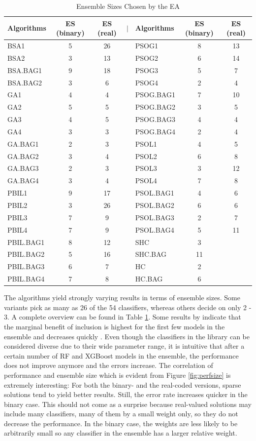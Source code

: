 \begin{table}[ht]
	\centering
	\begin{tabular}{lccllcc}
		\hline
		Algorithms & ES (binary) & ES (real) & $\mid$ & Algorithms & ES (binary) & ES (real) \\ 
		\hline
		BSA1 & 5 & 26 && PSOG1 & 8 & 13 \\ 
		BSA2 & 3 & 13 & &PSOG2 & 6 & 14 \\ 
		BSA.BAG1 & 9 & 18 && PSOG3 & 5 & 7 \\ 
		BSA.BAG2 & 3 & 6 & &PSOG4 & 2 & 4 \\ 
		GA1 & 4 & 4 & &PSOG.BAG1 & 7 & 10 \\ 
		GA2 & 5 & 5 & &PSOG.BAG2 & 3 & 5 \\ 
		GA3 & 4 & 5 & &PSOG.BAG3 & 4 & 4 \\ 
		GA4 & 3 & 3 & &PSOG.BAG4 & 2 & 4 \\ 
		GA.BAG1 & 2 & 3 && PSOL1 & 4 & 5 \\ 
		GA.BAG2 & 3 & 4 && PSOL2 & 6 & 8 \\ 
		GA.BAG3 & 2 & 3 & &PSOL3 & 3 & 12 \\ 
		GA.BAG4 & 3 & 4 & &PSOL4 & 7 & 8 \\ 
		PBIL1 & 9 & 17 & &PSOL.BAG1 & 4 & 6 \\ 
		PBIL2 & 3 & 26 & &PSOL.BAG2 & 6 & 6 \\ 
		PBIL3 & 7 & 9 & &PSOL.BAG3& 2 & 7 \\ 
		PBIL4 & 7 & 9 && PSOL.BAG4 & 5 & 11 \\ 
		PBIL.BAG1 & 8 & 12 && SHC & 3 & \\ 
		PBIL.BAG2 & 5 & 16 && SHC.BAG & 11 & \\ 
		PBIL.BAG3 & 6 & 7 && HC & 2 & \\ 
		PBIL.BAG4 & 7 & 8 && HC.BAG & 6 & \\ 
		\hline
	\end{tabular}
	\caption{Ensemble Sizes Chosen by the EA}
	\label{tbl:es}
\end{table}

The algorithms yield strongly varying results in terms of ensemble sizes. Some variants pick as many as 26 of the 54 classifiers, whereas others decide on only 2 - 3. A complete overview can be found in Table \ref{tbl:es}. Some results by \cite{opitz1999popular} indicate that the marginal benefit of inclusion is highest for the first few models in the ensemble and decreases quickly \cite[p. 190]{opitz1999popular}. Even though the classifiers in the library can be considered diverse due to their wide parameter range, it is intuitive that after a certain number of RF and XGBoost models in the ensemble, the performance does not improve anymore and the errors increase. The correlation of performance and ensemble size which is evident from Figure \ref{fig:perfsize} is extremely interesting: For both the binary- and the real-coded versions, sparse solutions tend to yield better results. Still, the error rate increases quicker in the binary case. This should not come as a surprise because real-valued solutions may include many classifiers, many of them by a small weight only, so they do not decrease the performance. In the binary case, the weights are less likely to be arbitrarily small so any classifier in the ensemble has a larger relative weight. 

